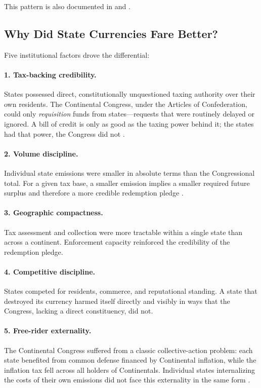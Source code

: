 \documentclass[12pt]{article}
\begin{document}
This pattern is also documented in \citet{Ferguson1961} and
\citet{Sumner1968}.

\subsection{Why Did State Currencies Fare Better?}

Five institutional factors drove the differential:

\paragraph{1.  Tax-backing credibility.}
States possessed direct, constitutionally unquestioned taxing authority over
their own residents.  The Continental Congress, under the Articles of
Confederation, could only \emph{requisition} funds from states---requests
that were routinely delayed or ignored.  A bill of credit is only as good as
the taxing power behind it; the states had that power, the Congress did not
\citep{Ferguson1961, Edling2014}.

\paragraph{2.  Volume discipline.}
Individual state emissions were smaller in absolute terms than the
Congressional total.  For a given tax base, a smaller emission implies a
smaller required future surplus and therefore a more credible redemption
pledge \citep{Grubb2003}.

\paragraph{3.  Geographic compactness.}
Tax assessment and collection were more tractable within a single state than
across a continent.  Enforcement capacity reinforced the credibility of the
redemption pledge.

\paragraph{4.  Competitive discipline.}
States competed for residents, commerce, and reputational standing.  A state
that destroyed its currency harmed itself directly and visibly in ways that
the Congress, lacking a direct constituency, did not.

\paragraph{5.  Free-rider externality.}
The Continental Congress suffered from a classic collective-action problem:
each state benefited from common defense financed by Continental inflation,
while the inflation tax fell across all holders of Continentals.  Individual
states internalizing the costs of their own emissions did not face this
externality in the same form \citep{MatsonOnuf1990}.
\end{document}
